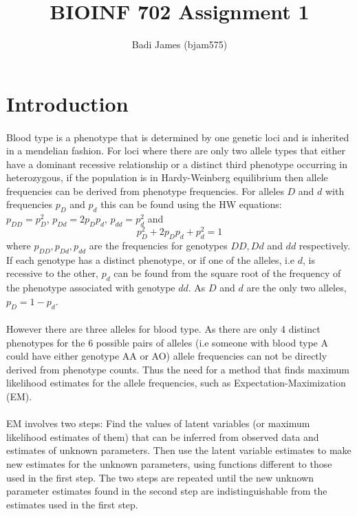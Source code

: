 \documentclass{article}
\title{\vspace{-2.0cm}BIOINF 702 Assignment 1}
\author{Badi James (bjam575)}
\begin{document}
	
	\maketitle
	
	\section{Introduction}
	
	\paragraph{}Blood type is a phenotype that is determined by one genetic loci and is inherited in a mendelian fashion. For loci where there are only two allele types that either have a dominant recessive relationship or a distinct third phenotype occurring in heterozygous, if the population is in Hardy-Weinberg equilibrium then allele frequencies can be derived from phenotype frequencies.
	For alleles $D$ and $d$ with frequencies $p_D$ and $p_d$ this can be found using the HW equations: \\
	$p_{DD} = p_D^2$, $p_{Dd} = 2p_Dp_d$, $p_{dd} = p_d^2$ and
	\[p_D^2 + 2p_Dp_d + p_d^2 = 1\]
	where $p_{DD}, p_{Dd}, p_{dd}$ are the frequencies for genotypes $DD, Dd$ and $dd$ respectively. If each genotype has a distinct phenotype, or if one of the alleles, i.e $d$, is recessive to the other, $p_d$ can be found from the square root of the frequency of the phenotype associated with genotype $dd$. As $D$ and $d$ are the only two alleles, $p_D = 1 - p_d$.
	
	\paragraph{} However there are three alleles for blood type. As there are only 4 distinct phenotypes for the 6 possible pairs of alleles (i.e someone with blood type A could have either genotype AA or AO) allele frequencies can not be directly derived from phenotype counts. Thus the need for a method that finds maximum likelihood estimates for the allele frequencies, such as Expectation-Maximization (EM). 
	
	\paragraph{}EM involves two steps: Find the values of latent variables (or maximum likelihood estimates of them) that can be inferred from observed data and estimates of unknown parameters. Then use the latent variable estimates to make new estimates for the unknown parameters, using functions different to those used in the first step. The two steps are repeated until the new unknown parameter estimates found in the second step are indistinguishable from the estimates used in the first step. 
	
\end{document}
